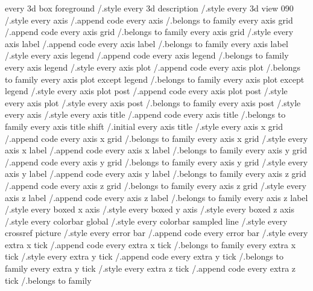 every 3d box foreground        /.style
every 3d description           /.style
every 3d view {0}{90}          /.style
every axis                     /.append code
every axis                     /.belongs to family
every axis grid                /.append code
every axis grid                /.belongs to family
every axis grid                /.style
every axis label               /.append code
every axis label               /.belongs to family
every axis label               /.style
every axis legend              /.append code
every axis legend              /.belongs to family
every axis legend              /.style
every axis plot                /.append code
every axis plot                /.belongs to family
every axis plot except legend  /.belongs to family
every axis plot except legend  /.style
every axis plot post           /.append code
every axis plot post           /.style
every axis plot                /.style
every axis post                /.belongs to family
every axis post                /.style
every axis                     /.style
every axis title               /.append code
every axis title               /.belongs to family
every axis title shift         /.initial
every axis title               /.style
every axis x grid              /.append code
every axis x grid              /.belongs to family
every axis x grid              /.style
every axis x label             /.append code
every axis x label             /.belongs to family
every axis y grid              /.append code
every axis y grid              /.belongs to family
every axis y grid              /.style
every axis y label             /.append code
every axis y label             /.belongs to family
every axis z grid              /.append code
every axis z grid              /.belongs to family
every axis z grid              /.style
every axis z label             /.append code
every axis z label             /.belongs to family
every axis z label             /.style
every boxed x axis             /.style
every boxed y axis             /.style
every boxed z axis             /.style
every colorbar global          /.style
every colorbar sampled line    /.style
every crossref picture         /.style
every error bar                /.append code
every error bar                /.style
every extra x tick             /.append code
every extra x tick             /.belongs to family
every extra x tick             /.style
every extra y tick             /.append code
every extra y tick             /.belongs to family
every extra y tick             /.style
every extra z tick             /.append code
every extra z tick             /.belongs to family
